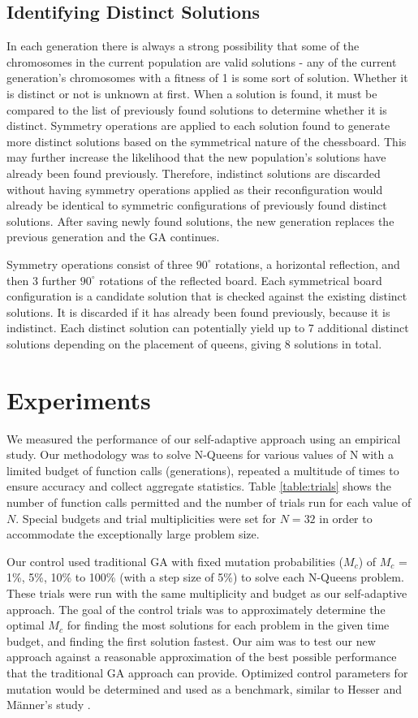 \documentclass[conference]{IEEEtran}
\begin{document}
\subsection{Identifying Distinct Solutions}
In each generation there is always a strong possibility that some of the chromosomes in the current population are valid solutions - any of the current generation's chromosomes with a fitness of 1 is some sort of solution. Whether it is distinct or not is unknown at first. When a solution is found, it must be compared to the list of previously found solutions to determine whether it is distinct. Symmetry operations are applied to each solution found to generate more distinct solutions based on the symmetrical nature of the chessboard. This may further increase the likelihood that the new population's solutions have already been found previously. Therefore, indistinct solutions are discarded without having symmetry operations applied as their reconfiguration would already be identical to symmetric configurations of previously found distinct solutions. After saving newly found solutions, the new generation replaces the previous generation and the GA continues.

Symmetry operations consist of three $90^{\circ}$ rotations, a horizontal reflection, and then 3 further $90^{\circ}$ rotations of the reflected board. Each symmetrical board configuration is a candidate solution that is checked against the existing distinct solutions. It is discarded if it has already been found previously, because it is indistinct. Each distinct solution can potentially yield up to 7 additional distinct solutions depending on the placement of queens, giving 8 solutions in total.

\section{Experiments}
We measured the performance of our self-adaptive approach using an empirical study. Our methodology was to solve N-Queens for various values of N with a limited budget of function calls (generations), repeated a multitude of times to ensure accuracy and collect aggregate statistics. Table \ref{table:trials} shows the number of function calls permitted and the number of trials run for each value of $N$. Special budgets and trial multiplicities were set for $N = 32$ in order to accommodate the exceptionally large problem size.

Our control used traditional GA with fixed mutation probabilities ($M_{c}$) of $M_{c}$ = 1\%, 5\%, 10\% to 100\% (with a step size of 5\%) to solve each N-Queens problem. These trials were run with the same multiplicity and budget as our self-adaptive approach. The goal of the control trials was to approximately determine the optimal $M_{c}$ for finding the most solutions for each problem in the given time budget, and finding the first solution fastest. Our aim was to test our new approach against a reasonable approximation of the best possible performance that the traditional GA approach can provide. Optimized control parameters for mutation would be determined and used as a benchmark, similar to Hesser and M\"{a}nner's study \cite{cit:14}.
\end{document}
